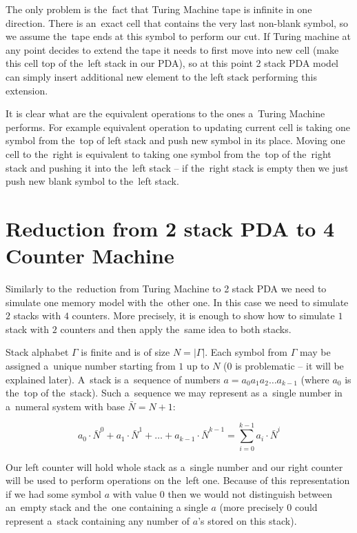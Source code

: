 \documentclass[english,shortabstract,mgr]{iithesis}
\begin{document}
The only problem is the~fact that Turing Machine tape is infinite in one direction.
There is an~exact cell that contains the very last non-blank symbol, so we assume the~tape
ends at this symbol to perform our cut. If Turing machine at any point decides to extend
the tape it needs to first move into new cell (make this cell top of the~left stack in our PDA),
so at this point 2 stack PDA model can simply insert additional new element to the left
stack performing this extension.

It is clear what are the equivalent operations to the ones a~Turing Machine performs.
For example equivalent operation to updating current cell is taking one symbol from
the~top of left stack and push new symbol in its place. Moving one cell to the~right
is equivalent to taking one symbol from the~top of the~right stack and pushing it
into the~left stack -- if the~right stack is empty then we just push new blank symbol
to the~left stack.

\section {Reduction from 2 stack PDA to 4 Counter Machine}

Similarly to the~reduction from Turing Machine to 2 stack PDA we need to simulate
one memory model with the~other one. In this case we need to simulate $2$ stacks
with $4$ counters. More precisely, it is enough to show how to simulate $1$ stack
with $2$ counters and then apply the~same idea to both stacks.

Stack alphabet $\Gamma$ is finite and is of size $N = |\Gamma|$. Each symbol from $\Gamma$ may
be assigned a~unique number starting from $1$ up to $N$ ($0$ is problematic -- it will be
explained later). A~stack is a~sequence of numbers $a = a_0 a_1 a_2 \dots a_{k-1}$ (where $a_0$
is the~top of the~stack). Such a~sequence we may represent as a~single number in a~numeral system
with base $\bar{N} = N+1$:

$$ a_0 \cdot \bar{N}^0 + a_1 \cdot \bar{N}^1 + \dots + a_{k-1} \cdot \bar{N}^{k-1}
    = \sum_{i=0}^{k-1} a_i \cdot \bar{N}^i $$

Our left counter will hold whole stack as a~single number and our right counter will be used
to perform operations on the~left one. Because of this representation if we had some symbol $a$
with value $0$ then we would not distinguish between an~empty stack and the~one containing
a single $a$ (more precisely $0$ could represent a~stack containing any number of $a$'s
stored on this stack).
\end{document}
